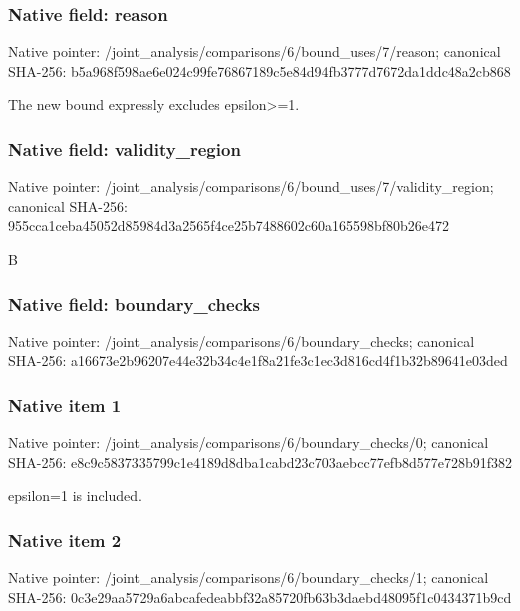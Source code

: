 \documentclass[10pt,a4paper]{article}
\begin{document}
\subsubsection{Native field: reason}
Native pointer: /joint\_\allowbreak{}analysis/comparisons/6/bound\_\allowbreak{}uses/7/reason; canonical SHA-256: b5a968f598ae6e024c99fe76867189c5e84d94fb3777d7672da1ddc48a2cb868

\begingroup\raggedright\sloppy The new bound expressly excludes epsilon>=\allowbreak{}1.\par\endgroup

\subsubsection{Native field: validity\_\allowbreak{}region}
Native pointer: /joint\_\allowbreak{}analysis/comparisons/6/bound\_\allowbreak{}uses/7/validity\_\allowbreak{}region; canonical SHA-256: 955cca1ceba45052d85984d3a2565f4ce25b7488602c60a165598bf80b26e472

\begingroup\raggedright\sloppy B\par\endgroup

\subsubsection{Native field: boundary\_\allowbreak{}checks}
Native pointer: /joint\_\allowbreak{}analysis/comparisons/6/boundary\_\allowbreak{}checks; canonical SHA-256: a16673e2b96207e44e32b34c4e1f8a21fe3c1ec3d816cd4f1b32b89641e03ded

\subsubsection{Native item 1}
Native pointer: /joint\_\allowbreak{}analysis/comparisons/6/boundary\_\allowbreak{}checks/0; canonical SHA-256: e8c9c5837335799c1e4189d8dba1cabd23c703aebcc77efb8d577e728b91f382

\begingroup\raggedright\sloppy epsilon=\allowbreak{}1 is included.\par\endgroup

\subsubsection{Native item 2}
Native pointer: /joint\_\allowbreak{}analysis/comparisons/6/boundary\_\allowbreak{}checks/1; canonical SHA-256: 0c3e29aa5729a6abcafedeabbf32a85720fb63b3daebd48095f1c0434371b9cd
\end{document}
